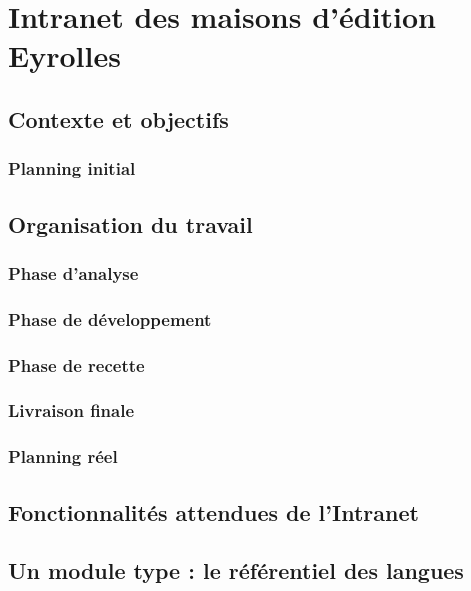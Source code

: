 \section{Intranet des maisons d'édition Eyrolles}

\subsection{Contexte et objectifs}

\subsubsection{Planning initial}

\subsection{Organisation du travail}

\subsubsection{Phase d'analyse}

\subsubsection{Phase de développement}

\subsubsection{Phase de recette}

\subsubsection{Livraison finale}

\subsubsection{Planning réel}

\subsection{Fonctionnalités attendues de l'Intranet}

\newpage



\subsection{Un module type : le référentiel des langues}
\label{section:eyrolles_ref-langues} 

